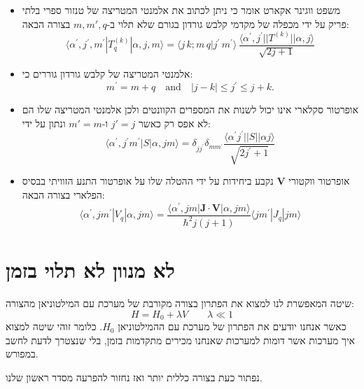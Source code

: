 \documentclass{tstextbook}
\begin{document}
\begin{summary}
  \begin{itemize}
    \item משפט ווגינר אקארט אומר כי ניתן לכתוב את אלמנטי המטריצה של טנזור ספרי בלתי פריק על ידי מכפלה של מקדמי קלבש גורדון בגורם שלא תלוי ב-\(m,m',q\) בצורה הבאה:
$$\langle\alpha^{\prime},j^{\prime},m^{\prime}|T_{q}^{(k)}|\alpha,j,m\rangle=\langle j\,k;m\,q|j^{\prime}\,m^{\prime}\rangle\,\frac{\langle\alpha^{\prime},j^{\prime}||T^{(k)}||\alpha,j\rangle}{\sqrt{2j+1}}$$
    \item אלמנטי המטריצה של קלבש גורדון גוררים כי:
$$m^{\prime}=m+q\quad\mathrm{and}\quad|j-k|\leq j^{\prime}\leq j+k.$$
    \item אופרטור סקלארי אינו יכול לשנות את המספרים הקוונטים ולכן אלמנטי המטריצה שלו הם לא אפס רק כאשר \(j'=j\) ו-\(m'=m\) ונתון על ידי:
 $$\langle\alpha^{\prime},j^{\prime}m^{\prime}|S|\alpha,j m\rangle=\delta_{j j^{\prime}}\delta_{m m^{\prime}}\frac{\langle\alpha^{\prime}j^{\prime}||S||\alpha j\rangle}{\sqrt{2j^{\prime}+1}}$$
    \item אופרטור ווקטורי \(\mathbf{V}\) נקבע ביחידות על ידי ההטלה שלו על אופרטור התנע הזוויתי בבסיס הפלארי בצורה הבאה:
 $$\langle\alpha^{\prime},j m^{\prime}|V_{q}|\alpha,j m\rangle=\frac{\langle\alpha^{\prime},j m|\mathbf{J}\cdot\mathbf{V}|\alpha,j m\rangle}{\hbar^{2}j(j+1)}\langle j m^{\prime}|J_{q}|j m\rangle$$
  \end{itemize}
\end{summary}

\section{לא מנוון לא תלוי בזמן}

\begin{definition}
שיטה המאפשרת לנו למצוא את הפתרון בצורה מקורבת של מערכת עם המילטוניאן מהצורה:
$$H= H_{0}+\lambda V\qquad \lambda\ll 1$$
כאשר אנחנו יודעים את הפתרון של מערכת עם ההמילטוניאן \(H_{0}\). כלומר זוהי שיטה למצוא איך מערכות אשר דומות למערכות שאנחנו מכירים מתקדמות בזמן, בלי שנצטרך לדעת לחשב במפורש.

\end{definition}
נפתור כעת בצורה כללית יותר ואז נחזור להפרעה מסדר ראשון שלנו.
\end{document}
